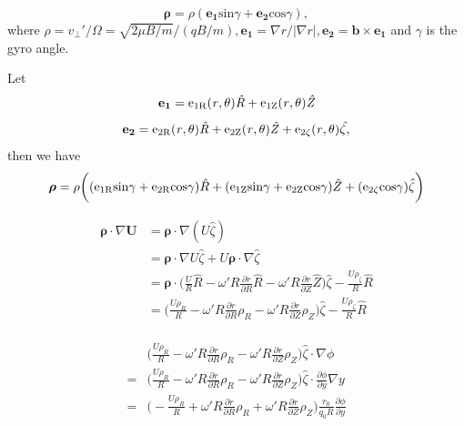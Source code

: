 \documentclass[12pt]{article}
\begin{document}
\begin{CJK*}{UTF8}{gbsn}
{\begin{equation*}
    \boldsymbol{\rho} = \rho(\mathbf{e_1}\textrm{sin}\gamma + \mathbf{e_2}\textrm{cos}\gamma),
\end{equation*}
where $\rho = v_{\perp}'/\Omega=\sqrt{2\mu B/m}/(qB/m), \mathbf{e_1}=\nabla r/|\nabla r|, \mathbf{e_2}=\mathbf{b}\times\mathbf{e_1}$ and 
$\gamma$ is the gyro angle.

Let
\begin{equation*}
    \bf{e_1}=\rm{e_{1R}}\it(r,\theta)\hat{R} + \rm{e_{1Z}}\it(r,\theta)\hat{Z}
\end{equation*}
\begin{equation*}
    \bf{e_2}=\rm{e_{2R}}\it(r,\theta)\hat{R} + \rm{e_{2Z}}\it(r,\theta)\hat{Z} + \rm{e_{2\zeta}}\it(r,\theta)\hat{\zeta},
\end{equation*} 
then we have
\begin{equation*}
    \boldsymbol{\rho}=\rho\bigg(({\rm e_{1R}sin}\gamma + {\rm e_{2R}cos}\gamma)\hat{R}
    + ({\rm e_{1Z}sin}\gamma + {\rm e_{2Z}cos}\gamma)\hat{Z} + ({\rm e_{2\zeta}cos}\gamma)\hat{\zeta}\bigg)
\end{equation*}
}
\begin{equation}
    \begin{split}
        \boldsymbol{\rho}\cdot\nabla \mathbf{U}&=\boldsymbol{\rho}\cdot\nabla(U\hat{\zeta})\\
        &=\boldsymbol{\rho}\cdot\nabla U\hat{\zeta} + U\boldsymbol{\rho}\cdot\nabla \hat{\zeta}\\
        &=\boldsymbol{\rho}\cdot\bigg(\frac{U}{R}\hat{R}-\omega'R\frac{\partial r}{\partial R}\hat{R}-\omega'R\frac{\partial r}{\partial Z}\hat{Z}\bigg)\hat{\zeta}
        -\frac{U\rho_\zeta}{R}\hat{R}\\
        &=\bigg(\frac{U\rho_R}{R} -\omega'R\frac{\partial r}{\partial R}\rho_R-\omega'R\frac{\partial r}{\partial Z}\rho_Z\bigg)\hat{\zeta}
        -\frac{U\rho_\zeta}{R}\hat{R}\\
    \end{split}
\end{equation}

\begin{equation}
    \begin{split}
        &\bigg(\frac{U\rho_R}{R} -\omega'R\frac{\partial r}{\partial R}\rho_R-\omega'R\frac{\partial r}{\partial Z}\rho_Z\bigg)\hat{\zeta}\cdot\nabla\phi\\ 
        =&\bigg(\frac{U\rho_R}{R} -\omega'R\frac{\partial r}{\partial R}\rho_R-\omega'R\frac{\partial r}{\partial Z}\rho_Z\bigg)\hat{\zeta}\cdot\frac{\partial\phi}{\partial y}\nabla y\\
        =&\bigg(-\frac{U\rho_R}{R} +\omega'R\frac{\partial r}{\partial R}\rho_R+\omega'R\frac{\partial r}{\partial Z}\rho_Z\bigg)\frac{r_0}{q_0R}\frac{\partial\phi}{\partial y}  
    \end{split}
\end{equation}


\end{CJK*}
\end{document}
